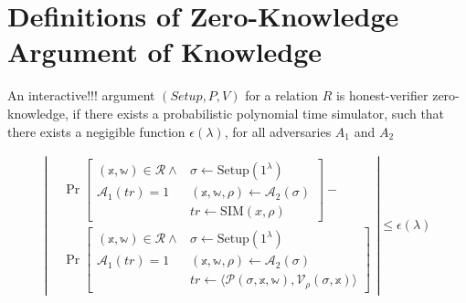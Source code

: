 
\section{Definitions of Zero-Knowledge Argument of Knowledge}\label{sec:appendix}
\begin{definition}
    An interactive!!! argument $(Setup, P, V)$ for a relation $R$ is honest-verifier zero-knowledge, if there exists a
    probabilistic polynomial time simulator, such that there exists a negigible function $\epsilon(\lambda)$, for all adversaries $A_1$ and $A_2$

    \begin{align*}
        \left| %
        \begin{aligned} %
            & \Pr \left[ %
                \begin{array}{c|l}
                (\mathbb{x},\mathbb{w}) \in \mathcal{R} \land & \sigma \leftarrow \text{Setup}(1^\lambda) \\
                \mathcal{A}_1(tr) = 1 & (\mathbb{x},\mathbb{w},\rho) \leftarrow \mathcal{A}_2(\sigma) \\
                & tr \leftarrow \text{SIM}(x,\rho)
                \end{array}
                \right] - \\ %
            & \Pr \left[ %
                \begin{array}{c|l}
                (\mathbb{x},\mathbb{w}) \in \mathcal{R} \land & \sigma \leftarrow \text{Setup}(1^\lambda) \\
                \mathcal{A}_1(tr) = 1 & (\mathbb{x},\mathbb{w},\rho) \leftarrow \mathcal{A}_2(\sigma) \\
                & tr \leftarrow \langle \mathcal{P}(\sigma,\mathbb{x},\mathbb{w}), \mathcal{V}_\rho(\sigma,\mathbb{x}) \rangle
                \end{array}
                \right]
        \end{aligned}
        \right| %
        \leq \epsilon(\lambda)
    \end{align*}
\end{definition}

